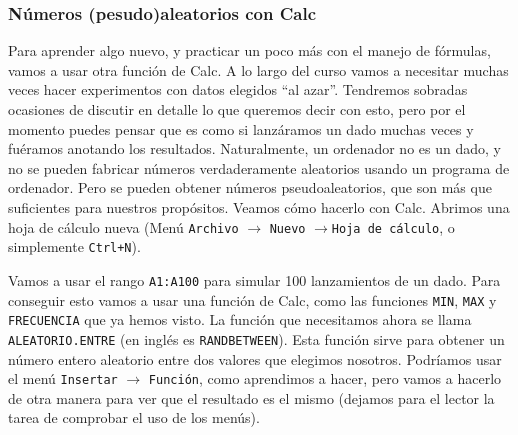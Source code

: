 \documentclass[10pt,a4paper]{article}\usepackage[]{graphicx}\usepackage[]{color}
\begin{document}
\subsubsection*{Números (pesudo)aleatorios con Calc}
\label{tut01:subsubsec:NumerosAleatoriosCalc}

Para aprender algo nuevo, y practicar un poco más con el manejo de fórmulas, vamos a usar otra función de Calc. A lo largo del curso vamos a necesitar muchas veces hacer experimentos con datos elegidos ``al azar''. Tendremos sobradas ocasiones de discutir en detalle lo que queremos decir con esto, pero  por el momento puedes pensar que es como si lanzáramos un dado muchas veces y  fuéramos anotando los resultados. Naturalmente, un ordenador no es un dado, y no se pueden fabricar números verdaderamente aleatorios usando un programa de ordenador. Pero se pueden obtener números {\sf pseudoaleatorios}, que son más que suficientes para nuestros propósitos. Veamos cómo hacerlo con Calc. Abrimos una hoja de cálculo nueva (Menú {\tt Archivo} $\to$ {\tt Nuevo} $\to${\tt Hoja de cálculo}, o simplemente {\tt Ctrl+N}).

Vamos a usar el rango {\tt A1:A100} para simular 100 lanzamientos de un dado. Para conseguir esto vamos a usar una función de Calc, como las funciones {\tt MIN}, {\tt MAX} y {\tt FRECUENCIA} que ya hemos visto. La función que necesitamos ahora se llama {\tt ALEATORIO.ENTRE} (en inglés es {\tt RANDBETWEEN}).  Esta función sirve para obtener un número entero aleatorio entre dos valores que elegimos nosotros. Podríamos usar el menú {\tt Insertar} $\to$ {\tt Función}, como aprendimos a hacer, pero vamos a hacerlo de otra manera para ver que el resultado es el mismo (dejamos para el lector la tarea de comprobar el uso de los menús).
\end{document}
